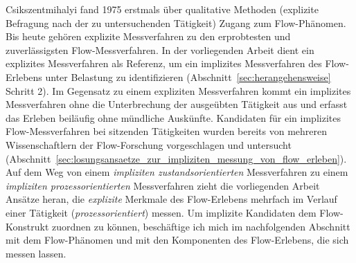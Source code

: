 

Csikszentmihalyi fand 1975 erstmals über qualitative Methoden (explizite Befragung nach der zu untersuchenden Tätigkeit) Zugang zum Flow-Phänomen. Bis heute gehören explizite Messverfahren zu den erprobtesten und zuverlässigsten Flow-Messverfahren. In der vorliegenden Arbeit dient ein explizites Messverfahren als Referenz, um ein implizites Messverfahren des Flow-Erlebens unter Belastung zu identifizieren (Abschnitt~\ref{sec:herangehensweise} Schritt 2). Im Gegensatz zu einem expliziten Messverfahren kommt ein implizites Messverfahren ohne die Unterbrechung der ausgeübten Tätigkeit aus und erfasst das Erleben beiläufig ohne mündliche Auskünfte. Kandidaten für ein implizites Flow-Messverfahren bei sitzenden Tätigkeiten wurden bereits von mehreren Wissenschaftlern der Flow-Forschung vorgeschlagen und untersucht (Abschnitt~\ref{sec:losungsansaetze_zur_impliziten_messung_von_flow_erleben}). Auf dem Weg von einem \emph{impliziten zustandsorientierten} Messverfahren zu einem \emph{impliziten prozessorientierten} Messverfahren zieht die vorliegenden Arbeit Ansätze heran, die \emph{explizite} Merkmale des Flow-Erlebens mehrfach im Verlauf einer Tätigkeit (\emph{prozessorientiert}) messen. Um implizite Kandidaten dem Flow-Konstrukt zuordnen zu können, beschäftige ich mich im nachfolgenden Abschnitt mit dem Flow-Phänomen und mit den Komponenten des Flow-Erlebens, die sich messen lassen.
